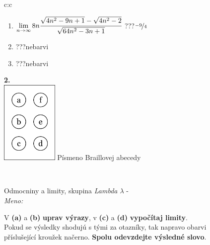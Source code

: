 \documentclass[10pt]{report}
\begin{document}
\begin{tabular}{c:c}
\begin{minipage}[c][104.5mm][t]{0.5\linewidth}
\begin{center}
\begin{minipage}{0.79\linewidth}
\begin{center}
\begin{varwidth}{\linewidth}
\begin{enumerate}
\item $\lim\limits_{n\to\infty}8n\cfrac{\sqrt{4n^2-9n+1}-\sqrt{4n^2-2}}{\sqrt{64n^2-3n+1}}$\quad \dotfill\; ???\;\dotfill \quad $\nicefrac{-9}{4}$
\item \quad \dotfill\; ???\;\dotfill \quad nebarvi
\item \quad \dotfill\; ???\;\dotfill \quad nebarvi
\end{enumerate}
\end{varwidth}
\end{center}
\end{minipage}
\begin{minipage}{0.20\linewidth}
\begin{center}
{\Huge\bfseries 2.} \\[2mm]
\includegraphics[height=40mm]{../images/braille.png}
{\small Písmeno Braillovej abecedy}
\end{center}
\end{minipage}
\end{center}
\end{minipage}
\\ \hdashline
\begin{minipage}[c][104.5mm][t]{0.5\linewidth}
\begin{center}
\vspace{7mm}
{\huge Odmocniny a limity, skupina \textit{Lambda $\lambda$} -}\\[5mm]
\textit{Meno:}\phantom{xxxxxxxxxxxxxxxxxxxxxxxxxxxxxxxxxxxxxxxxxxxxxxxxxxxxxxxxxxxxxxxxx}\\[5mm]
\begin{minipage}{0.95\linewidth}
\begin{center}
V \textbf{(a)} a \textbf{(b)} \textbf{uprav výrazy}, v \textbf{(c)} a \textbf{(d)} \textbf{vypočítaj limity}.\\Pokud se výsledky shodujú s tými za otazníky, tak napravo obarvi\\příslušející kroužek načerno. \textbf{Spolu odevzdejte výsledné slovo}.
\end{center}
\end{minipage}
\\[1mm]

\end{center}
\end{minipage}
\end{tabular}
\end{document}
